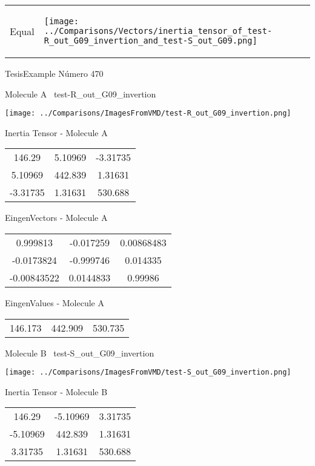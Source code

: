 \vtab[-5mm]
\begin{tabular}{*{2}{m{}}}
\begin{center}
\textcolor{NavyBlue}{\Large Equal}
\end{center}
&
\begin{center}
\texttt{[image: ../Comparisons/Vectors/inertia\_tensor\_of\_test-R\_out\_G09\_invertion\_and\_test-S\_out\_G09.png]}
\end{center}
\end{tabular}

 \newpage

\vtab[-3cm]
\begin{center}
{\large TesisExample \tab Número 470}
\end{center}
\begin{multicols}{2}
\begin{center}

Molecule A \
test-R\_out\_G09\_invertion

\texttt{[image: ../Comparisons/ImagesFromVMD/test-R\_out\_G09\_invertion.png]}

Inertia Tensor - Molecule A \\
\begin{tabular}{|c c c|}
146.29	 & 	5.10969	 & 	-3.31735	 \\
5.10969	 & 	442.839	 & 	1.31631	 \\
-3.31735	 & 	1.31631	 & 	530.688
\end{tabular}

\vtab
 EingenVectors - Molecule A     \\
\begin{tabular}{|c c c|}
0.999813	 & 	-0.017259	 & 	0.00868483	 \\
-0.0173824	 & 	-0.999746	 & 	0.014335	 \\
-0.00843522	 & 	0.0144833	 & 	0.99986
\end{tabular}

\vtab
 EingenValues - Molecule A     \\
\begin{tabular}{|c c c|}
146.173	 & 	442.909	 & 	530.735	 \\
\end{tabular}
\columnbreak

Molecule B \
test-S\_out\_G09\_invertion

\texttt{[image: ../Comparisons/ImagesFromVMD/test-S\_out\_G09\_invertion.png]}

Inertia Tensor - Molecule B \\
\begin{tabular}{|c c c|}
146.29	 & 	-5.10969	 & 	3.31735	 \\
-5.10969	 & 	442.839	 & 	1.31631	 \\
3.31735	 & 	1.31631	 & 	530.688
\end{tabular}


\end{center}
\end{multicols}
